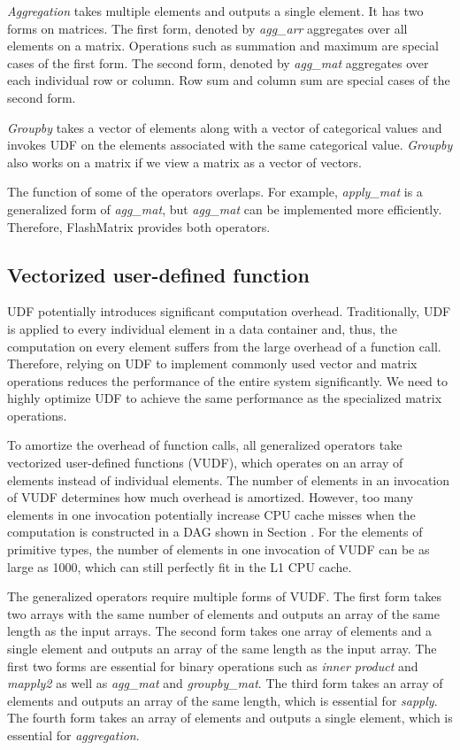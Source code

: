 \textit{Aggregation} takes multiple elements and outputs a single element.
It has two forms on matrices. The first form, denoted by \textit{agg\_arr}
aggregates over all elements on a matrix. Operations such as summation and
maximum are special cases of the first form. The second form, denoted by
\textit{agg\_mat} aggregates over each individual row or column.
Row sum and column sum are special cases of the second form.

\textit{Groupby} takes a vector of elements along with a vector of categorical
values and invokes UDF on the elements associated with the same categorical
value. \textit{Groupby} also works on a matrix if we view a matrix as a vector
of vectors.

The function of some of the operators overlaps. For example, \textit{apply\_mat}
is a generalized form of \textit{agg\_mat}, but \textit{agg\_mat} can be
implemented more efficiently. Therefore, FlashMatrix provides both operators.


\subsection{Vectorized user-defined function}
UDF potentially introduces significant computation overhead. Traditionally,
UDF is applied to every individual element in a data container and, thus,
the computation on every element suffers from the large overhead of a function
call. Therefore, relying on UDF to implement commonly used vector and matrix
operations reduces the performance of the entire system significantly.
We need to highly optimize UDF to achieve the same performance as
the specialized matrix operations.

To amortize the overhead of function calls, all generalized operators take
vectorized user-defined functions (VUDF), which operates on an array of elements
instead of individual elements. The number of elements in an invocation of
VUDF determines how much overhead is amortized. However, too many elements
in one invocation potentially increase CPU cache misses when the computation
is constructed in a DAG shown in Section {}. For the elements of primitive
types, the number of elements in one invocation of VUDF can be as large as 1000,
which can still perfectly fit in the L1 CPU cache.

The generalized operators require multiple forms of VUDF. The first form takes
two arrays with the same number of elements and outputs an array of the same
length as the input arrays. The second form takes one array of elements and
a single element and outputs an array of the same length as the input array.
The first two forms are essential for binary operations such as
\textit{inner product} and \textit{mapply2} as well as \textit{agg\_mat} and
\textit{groupby\_mat}.
The third form takes an array of elements and outputs an array of the same
length, which is essential for \textit{sapply}.
The fourth form takes an array of elements and outputs a single element,
which is essential for \textit{aggregation}.

